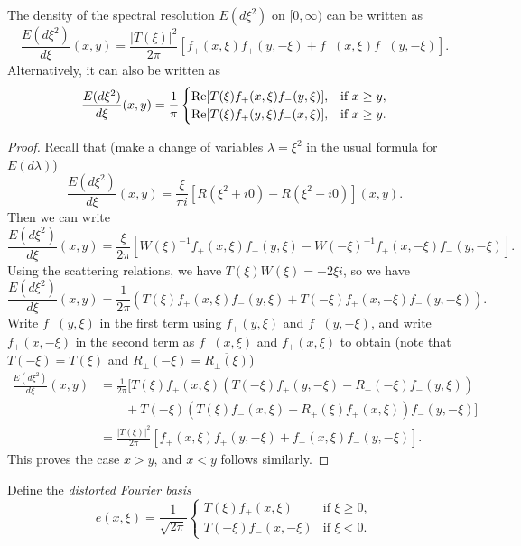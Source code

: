 \begin{lemma}
  The density of the spectral resolution
  $E(d\xi^2)$ on $[0, \infty)$ can be written as
  \[
    \frac{E(d\xi^2)}{d\xi}(x, y)
    = \frac{|T(\xi)|^2}{2\pi} [f_+(x, \xi) f_+(y, -\xi) + f_-(x, \xi) f_-(y, -\xi)].
  \]
  Alternatively, it can also be written as
  \[
    \frac{E(d\xi^2)}{d\xi}(x, y)
    = \frac{1}{\pi}
    \begin{cases}
      \operatorname{Re} [T(\xi) f_+(x, \xi) f_-(y, \xi)], & \text{if $x \ge y$}, \\
      \operatorname{Re} [T(\xi) f_+(y, \xi) f_-(x, \xi)], & \text{if $x \ge y$}.
    \end{cases}
  \]
\end{lemma}

\begin{proof}
  Recall that (make a change of variables $\lambda = \xi^2$
  in the usual formula for $E(d\lambda)$)
  \[
    \frac{E(d\xi^2)}{d\xi}(x, y)
    = \frac{\xi}{\pi i} [R(\xi^2 + i0) - R(\xi^2 - i0)](x, y).
  \]
  Then we can write
  \[
    \frac{E(d\xi^2)}{d\xi}(x, y)
    = \frac{\xi}{2\pi} [W(\xi)^{-1} f_+(x, \xi) f_-(y, \xi) - W(-\xi)^{-1} f_+(x, -\xi) f_-(y, -\xi)].
  \]
  Using the scattering relations, we have
  $T(\xi) W(\xi) = -2 \xi i$, so we have
  \[
    \frac{E(d\xi^2)}{d\xi}(x, y)
    = \frac{1}{2\pi}(T(\xi) f_+(x, \xi) f_-(y, \xi) + T(-\xi) f_+(x, -\xi) f_-(y, -\xi)).
  \]
  Write $f_-(y, \xi)$ in the first term
  using $f_+(y, \xi)$ and $f_-(y, -\xi)$, and
  write $f_+(x, -\xi)$ in the second term
  as $f_-(x, \xi)$ and $f_+(x, \xi)$ to obtain
  (note that $T(-\xi) = T(\xi)$ and
  $R_{\pm}(-\xi) = \overline{R_{\pm}(\xi)}$)
  \begin{align*}
    \frac{E(d\xi^2)}{d\xi}(x, y)
    &= \frac{1}{2\pi} [T(\xi) f_+(x, \xi)(T(-\xi) f_+(y, -\xi) - R_-(-\xi) f_-(y, \xi)) \\
    & \quad \quad + T(-\xi)(T(\xi)f_-(x, \xi) - R_+(\xi) f_+(x, \xi)) f_-(y, -\xi)] \\
    &= \frac{|T(\xi)|^2}{2\pi} [f_+(x, \xi) f_+(y, -\xi) + f_-(x, \xi) f_-(y, -\xi)].
  \end{align*}
  This proves the case $x > y$, and $x < y$ follows
  similarly.
\end{proof}

\begin{definition}
  Define the \emph{distorted Fourier basis}
  \[
    e(x, \xi) = \frac{1}{\sqrt{2\pi}}
    \begin{cases}
      T(\xi) f_+(x, \xi) & \text{if $\xi \ge 0$}, \\
      T(-\xi) f_-(x, -\xi) & \text{if $\xi < 0$}.
    \end{cases}
  \]
\end{definition}
